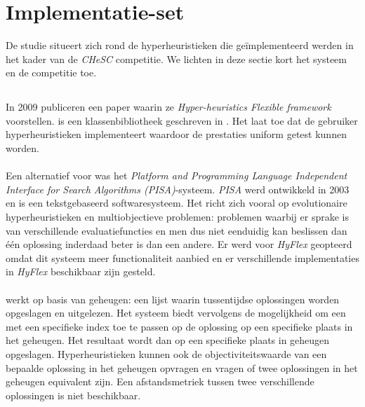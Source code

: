 \section{Implementatie-set}

De studie situeert zich rond de hyperheuristieken die ge\"implementeerd werden in het kader van de \emph{CHeSC} competitie. We lichten in deze sectie kort het systeem en de competitie toe.

\subsection{\abhf{}}

In 2009 publiceren  een paper waarin ze \emph{Hyper-heuristics Flexible framework \abhf{}} voorstellen. \abhf{} is een klassenbibliotheek geschreven in \abjava{}. Het laat toe dat de gebruiker hyperheuristieken implementeert waardoor de prestaties uniform getest kunnen worden.

\paragraph{}
Een alternatief voor \abhf{} was het \emph{Platform and Programming Language Independent Interface for Search Algorithms (PISA)}-systeem\cite{Bleuler03pisa-}. \emph{PISA} werd ontwikkeld in 2003 en is een tekstgebaseerd softwaresysteem. Het richt zich vooral op evolutionaire hyperheuristieken en multiobjectieve problemen: problemen waarbij er sprake is van verschillende evaluatiefuncties en men dus niet eenduidig kan beslissen dan \'e\'en oplossing inderdaad beter is dan een andere. Er werd voor \emph{HyFlex} geopteerd omdat dit systeem meer functionaliteit aanbied en er verschillende implementaties in \emph{HyFlex} beschikbaar zijn gesteld.

\paragraph{}
\abhf{} werkt op basis van geheugen: een lijst waarin tussentijdse oplossingen worden opgeslagen en uitgelezen. Het systeem biedt vervolgens de mogelijkheid om een \abllh{} met een specifieke index toe te passen op de oplossing op een specifieke plaats in het geheugen. Het resultaat wordt dan op een specifieke plaats in geheugen opgeslagen. Hyperheuristieken kunnen ook de objectiviteitswaarde van een bepaalde oplossing in het geheugen opvragen en vragen of twee oplossingen in het geheugen equivalent zijn. Een afstandsmetriek tussen twee verschillende oplossingen is niet beschikbaar.

